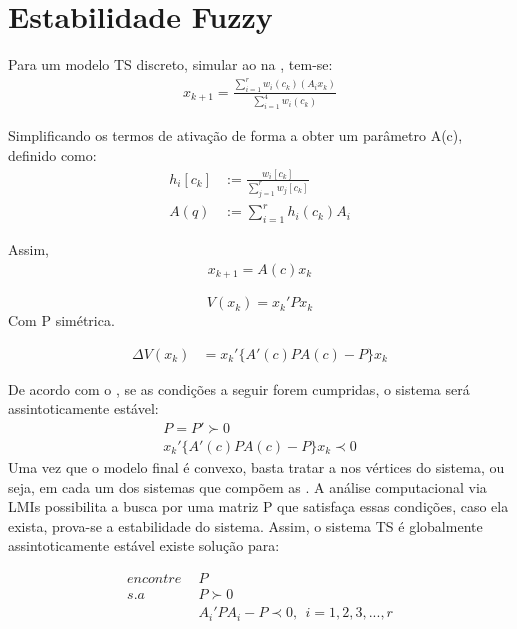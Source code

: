 \section{Estabilidade Fuzzy}
Para um modelo TS discreto, simular ao na , tem-se:
\begin{align*}
	x_{k+1} = \frac{\sum_{i=1}^{r}  w_i(c_k)(A_i x_k)}{\sum_{i=1}^{4} w_i(c_k)} 
\end{align*}

Simplificando os termos de ativação de forma a obter um parâmetro A(c), definido como:
\begin{align*}
	h_i[c_k] &:= \frac{w_i[c_k]}{\sum_{j=1}^{r}w_j[c_k]} \\
	A(q) &:= \sum_{i=1}^{r} h_i(c_k)A_i
\end{align*}

Assim,
\begin{align}
	x_{k+1} = A(c) x_k
\end{align}

\begin{equation}
	V(x_k) = x_k' P x_k
\end{equation}
Com P simétrica.

\begin{align}
	\Delta V(x_k) &= x_k'\{A'(c)PA(c) - P\}x_k
\end{align}

De acordo com o , se as condições a seguir forem cumpridas, o sistema será assintoticamente estável:
\begin{align}
	P = P' \succ 0 \\
	x_k'\{A'(c)PA(c) - P \}x_k \prec 0 \label{eqLyapXk}
\end{align}
Uma vez que o modelo final é convexo, basta tratar a  nos vértices do sistema, ou seja, em cada um dos sistemas que compõem as . 
A análise computacional via LMIs possibilita a busca por uma matriz P que satisfaça essas condições, caso ela exista, prova-se a estabilidade do sistema. Assim, o sistema TS é globalmente assintoticamente estável \cite{tanakaWang} existe solução para:

\begin{align}
	encontre \ \ &P \nonumber \\
	s.a \ \ &P \succ 0 \nonumber \\
	&A_i'PA_i - P \prec 0, \ \ i=1,2,3, ... , r
\end{align}

